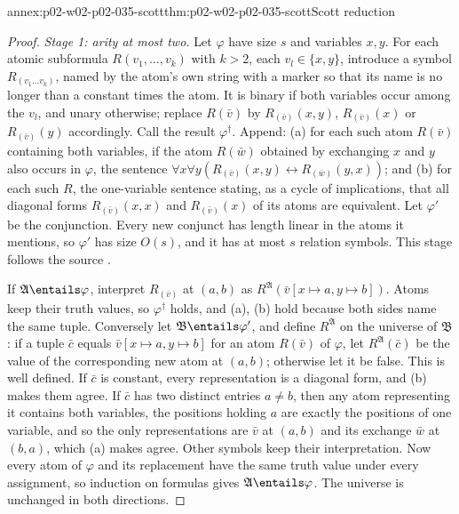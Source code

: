 \begin{annexitem}{annex:p02-w02-p02-035-scott}{thm:p02-w02-p02-035-scott}{Scott reduction}
\begin{proof}
\emph{Stage 1: arity at most two.}  Let \(\varphi\) have size \(s\) and
variables \(x,y\).  For each atomic subformula \(R(v_1,\ldots,v_k)\) with
\(k>2\), each \(v_l\in\{x,y\}\), introduce a symbol \(R_{(v_1\ldots v_k)}\),
named by the atom's own string with a marker so that its name is no longer
than a constant times the atom.  It is binary if both variables occur among
the \(v_l\), and unary otherwise; replace \(R(\bar v)\) by
\(R_{(\bar v)}(x,y)\), \(R_{(\bar v)}(x)\) or \(R_{(\bar v)}(y)\) accordingly.
Call the result \(\varphi^\dagger\).  Append: (a) for each such atom
\(R(\bar v)\) containing both variables, if the atom \(R(\bar w)\) obtained by
exchanging \(x\) and \(y\) also occurs in \(\varphi\), the sentence
\(\forall x\forall y(R_{(\bar v)}(x,y)\leftrightarrow R_{(\bar w)}(y,x))\); and
(b) for each such \(R\), the one-variable sentence stating, as a cycle of
implications, that all diagonal forms \(R_{(\bar v)}(x,x)\) and
\(R_{(\bar v)}(x)\) of its atoms are equivalent.  Let \(\varphi'\) be the
conjunction.  Every new conjunct has length linear in the atoms it mentions,
so \(\varphi'\) has size \(O(s)\), and it has at most \(s\) relation symbols.
This stage follows the source \cite[pp.~4--5]{GradelKolaitisVardi1997}.

If \(\mathfrak A\entails\varphi\), interpret \(R_{(\bar v)}\) at \((a,b)\) as
\(R^{\mathfrak A}(\bar v[x\mapsto a,y\mapsto b])\).  Atoms keep their truth
values, so \(\varphi^\dagger\) holds, and (a), (b) hold because both sides name
the same tuple.  Conversely let \(\mathfrak B\entails\varphi'\), and define
\(R^{\mathfrak A}\) on the universe of \(\mathfrak B\): if a tuple \(\bar c\)
equals \(\bar v[x\mapsto a,y\mapsto b]\) for an atom \(R(\bar v)\) of
\(\varphi\), let \(R^{\mathfrak A}(\bar c)\) be the value of the corresponding
new atom at \((a,b)\); otherwise let it be false.  This is well defined.  If
\(\bar c\) is constant, every representation is a diagonal form, and (b) makes
them agree.  If \(\bar c\) has two distinct entries \(a\neq b\), then any atom
representing it contains both variables, the positions holding \(a\) are
exactly the positions of one variable, and so the only representations are
\(\bar v\) at \((a,b)\) and its exchange \(\bar w\) at \((b,a)\), which (a)
makes agree.  Other symbols keep their interpretation.  Now every atom of
\(\varphi\) and its replacement have the same truth value under every
assignment, so induction on formulas gives \(\mathfrak A\entails\varphi\).
The universe is unchanged in both directions.


\end{proof}
\end{annexitem}
